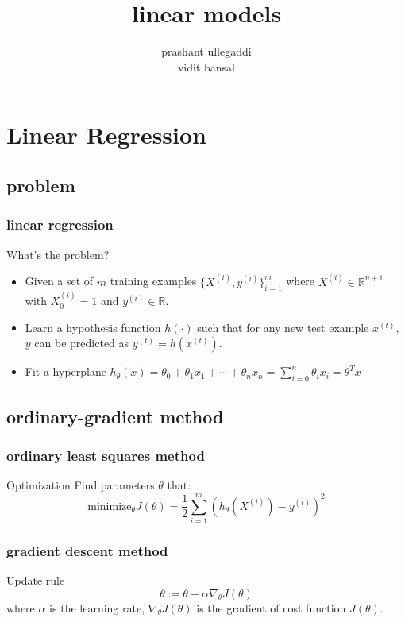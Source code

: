 \documentclass[11pt]{beamer}
\title{linear models}
\author[Prashant]{prashant ullegaddi\\ vidit bansal
}
\begin{document}
\begin{frame}
	\titlepage
\end{frame}


\section{Linear Regression}
\subsection{problem}
\begin{frame}
	\frametitle{\textbf{linear regression}}
	\begin{block}{What's the problem?}
	\begin{itemize}
		\item Given a set of $m$ training examples $\{X^{(i)}, y^{(i)}\}_{i=1}^m$ 
		where $X^{(i)} \in \mathbb{R}^{n+1}$
		with $X^{(i)}_0 = 1$ and $y^{(i)} \in \mathbb{R}$.
		\item Learn a hypothesis function $h(\cdot)$ such that for any new test example $x^{(t)}$, $y$ can be predicted as 
		$y^{(t)} = h(x^{(t)})$.
		\item Fit a hyperplane $h_\theta(x) = \theta_0 + \theta_1 x_1 + \cdots + \theta_n x_n = \sum_{i=0}^n \theta_i x_i = \theta^T x$
	\end{itemize}
	\end{block}
\end{frame}

\subsection{ordinary-gradient method}
\begin{frame}
	\frametitle{ordinary least squares method}
	\begin{block}{Optimization}
	Find parameters $\theta$ that:
	\begin{equation*}	
		\textrm{minimize}_\theta J(\theta) = \frac{1}{2} \sum_{i=1}^{m} (h_\theta (X^{(i)}) - y^{(i)})^2
	\end{equation*} 
   	\end{block}
\end{frame}

\begin{frame}
	\frametitle{gradient descent method}
	\begin{block}{Update rule}
     	\begin{equation*}
		\theta := \theta - \alpha \nabla_\theta J(\theta)
	\end{equation*}
	\indent where $\alpha$ is the learning rate, 
	$\nabla_\theta J(\theta)$ is the gradient of cost function $J(\theta)$.
   	\end{block}
\end{frame}
\end{document}
